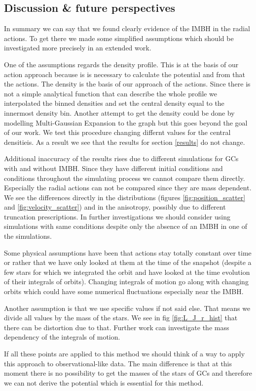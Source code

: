 \subsection{Discussion \& future perspectives}
In summary we can say that we found clearly evidence of the \ac{IMBH} in the radial actions. To get there we made some simplified assumptions which should be investigated more precisely in an extended work. 
\par One of the assumptions regards the density profile. This is at the basis of our action approach because is is necessary to calculate the potential and from that the actions. The density is the basis of our approach of the actions. Since there is not a simple analytical function that can describe the whole profile we interpolated the binned densities and set the central density equal to the innermost density bin. Another attempt to get the density could be done by modelling Multi-Gaussian Expansion to the graph but this goes beyond the goal of our work. We test this procedure changing differnt values for the central densitieis. As a result we see that the results for section \ref{results} do not change.
\par Additional inaccuracy of the results rises due to different simulations for \acp{GC} with and without \ac{IMBH}. Since they have different initial conditions and conditions throughout the simulating process we cannot compare them directly. Especially the radial actions can not be compared since they are mass dependent. We see the differences directly in the distributions (figures \ref{fig:position_scatter} and \ref{fig:velocity_scatter}) and in the anisotropy, possibly due to different truncation prescriptions. In further investigations we should consider using simulations with same conditions despite only the absence of an \ac{IMBH} in one of the simulations. 
\par Some physical assumptions have been that actions stay totally constant over time or rather that we have only looked at them at the time of the snapshot (despite a few stars for which we integrated the orbit and have looked at the time evolution of their integrals of orbits). Changing integrals of motion go along with changing orbits which could have some numerical fluctuations especially near the \ac{IMBH}. 
\par Another assumption is that we use specific values if not said else. That means we divide all values by the mass of the stars. We see in fig \ref{fig:L_J_r_hist} that there can be distortion due to that. Further work can investigate the mass dependency of the integrals of motion. 
\par If all these points are applied to this method we should think of a way to apply this approach to observational-like data. The main difference is that at this moment there is no possibility to get the masses of the stars of \acp{GC} and therefore we can not derive the potential which is essential for this method. 




